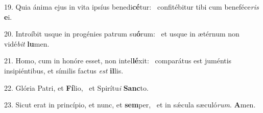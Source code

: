 19. Quia ánima ejus in vita ipsíus benedi\textbf{cé}tur: \ast\  confitébitur tibi cum beneféce\textit{ris} \textbf{e}i.\

20. Introíbit usque in progénies patrum su\textbf{ó}rum: \ast\  et usque in ætérnum non vidé\textit{bit} \textbf{lu}men.\

21. Homo, cum in honóre esset, non intel\textbf{lé}xit: \ast\  comparátus est juméntis insipiéntibus, et símilis factus \textit{est} \textbf{il}lis.\

22. Glória Patri, et \textbf{Fí}lio, \ast\  et Spirítu\textit{i} \textbf{Sanc}to.\

23. Sicut erat in princípio, et nunc, et \textbf{sem}per, \ast\  et in sǽcula sæculó\textit{rum}. \textbf{A}men.\

